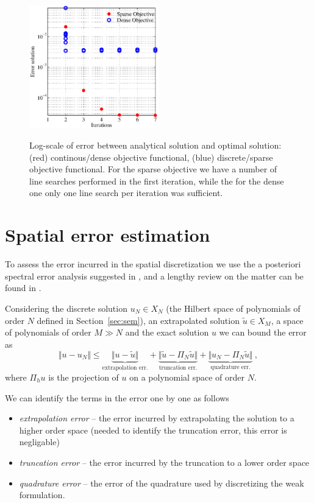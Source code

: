 \documentclass[10pt]{article}
\begin{document}
{\begin{figure}[!ht]
\centering
\includegraphics[width=0.5\textwidth]{decayregvsc.eps}
\label{fig:opt_heatass}
\caption{Log-scale of error between analytical solution and optimal solution: (red) continous/dense objective functional, (blue) discrete/sparse objective functional. For the sparse objective we have a number of line searches performed in the first iteration, while the for the dense one only one line search per iteration was sufficient.}
\end{figure}

\section{Spatial error estimation}
\label{sec:err}
To assess the error incurred in the spatial discretization we use the a posteriori spectral error analysis suggested in \cite{Mavriplis1990}, and a lengthy review on the matter can be found in \cite{kopriva2009}. 

Considering the discrete solution $u_N\in X_N$ (the Hilbert space of polynomials of order $N$ defined in Section~\ref{sec:sem}), an extrapolated solution $\tilde u\in X_M$, a space of polynomials of order $M\gg N$ and the exact solution $u$ we can bound the error as
$$\Vert u - u_N\Vert \leq \underbrace{\Vert u-\tilde u\Vert}_{\text{extrapolation err.}} + \underbrace{\Vert \tilde u- \Pi_N \tilde u\Vert}_{\text{truncation err.}} + \underbrace{\Vert u_N-\Pi_N \tilde u\Vert}_{\text{quadrature err.}} \ ,$$
where $\Pi_h u$ is the projection of $u$ on a polynomial space of order $N$.

We can identify the terms in the error one by one as follows
\begin{itemize}
\item \textit{extrapolation error} -- the error incurred by extrapolating the solution to a higher order space (needed to identify the truncation error, this error is negligable)
\item \textit{truncation error} -- the error incurred by the truncation to a lower order space
\item \textit{quadrature error} -- the error of the quadrature used by discretizing the weak formulation.
\end{itemize}

}
\end{document}
